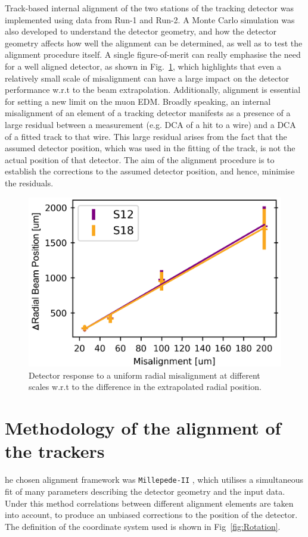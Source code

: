\documentclass[12pt]{article}
\begin{document}
Track-based internal alignment of the two stations of the tracking detector was implemented using data from Run-1 and Run-2. A Monte Carlo simulation was also developed to understand the detector geometry, and how the detector geometry affects how well the alignment can be determined, as well as to test the alignment procedure itself. A single figure-of-merit can really emphasise the need for a well aligned detector, as shown in Fig.~\ref{fig:rad_inter}, which highlights that even a relatively small scale of misalignment can have a large impact on the detector performance w.r.t to the beam extrapolation. Additionally, alignment is essential for setting a new limit on the muon EDM. Broadly speaking, an internal misalignment of an element of a tracking detector manifests as a presence of a large residual between a measurement (e.g. DCA of a hit to a wire) and a DCA of a fitted track to that wire. This large residual arises from the fact that the assumed detector position, which was used in the fitting of the track, is not the actual position of that detector. The aim of the alignment procedure is to establish the corrections to the assumed detector position, and hence, minimise the residuals.

\begin{figure}[h!]
\centering
\includegraphics[width=0.6\linewidth]{fig/internal_rad.png}
\caption{Detector response to a uniform radial misalignment at different scales w.r.t to the difference in the extrapolated radial position.}
\label{fig:rad_inter}
\end{figure}

\section{Methodology of the alignment of the trackers}
he chosen alignment framework was \texttt{Millepede-II} \cite{mp2}, which utilises a simultaneous fit of many parameters describing the detector geometry and the input data. Under this method correlations between different alignment elements are taken into account, to produce an unbiased corrections to the position of the detector. The definition of the coordinate system used is shown in Fig~\ref{fig:Rotation}.
\end{document}
